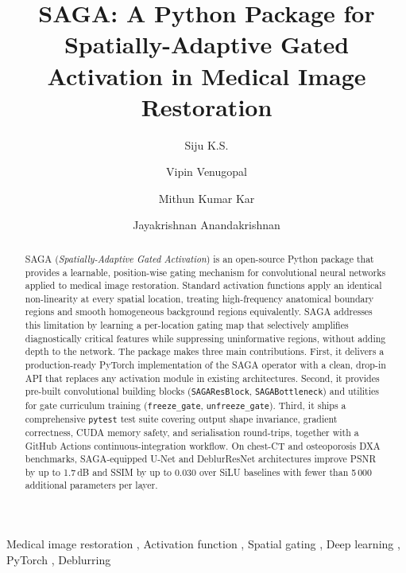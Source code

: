\documentclass[preprint,12pt]{elsarticle}
\begin{document}
\begin{frontmatter}

\title{SAGA: A Python Package for Spatially-Adaptive Gated Activation
       in Medical Image Restoration}

\author[uoh]{Siju K.S.}
\author[uoh]{Vipin Venugopal}
\author[uoh]{Mithun Kumar Kar}
\author[uoh]{Jayakrishnan Anandakrishnan}

\address[uoh]{Department of Computer Science and Engineering,
              [Author Institution], Kerala, India}


\begin{keyword}
Medical image restoration \sep
Activation function \sep
Spatial gating \sep
Deep learning \sep
PyTorch \sep
Deblurring
\end{keyword}

\begin{abstract}
SAGA (\textit{Spatially-Adaptive Gated Activation}) is an open-source Python
package that provides a learnable, position-wise gating mechanism for
convolutional neural networks applied to medical image restoration.
Standard activation functions apply an identical non-linearity at every
spatial location, treating high-frequency anatomical boundary regions and
smooth homogeneous background regions equivalently.
SAGA addresses this limitation by learning a per-location gating map
that selectively amplifies diagnostically critical features while
suppressing uninformative regions, without adding depth to the
network.
The package makes three main contributions.
First, it delivers a production-ready PyTorch implementation of the SAGA
operator with a clean, drop-in API that replaces any activation module in
existing architectures.
Second, it provides pre-built convolutional building blocks
(\texttt{SAGAResBlock}, \texttt{SAGABottleneck}) and utilities for gate
curriculum training (\texttt{freeze\_gate}, \texttt{unfreeze\_gate}).
Third, it ships a comprehensive \texttt{pytest} test suite covering output
shape invariance, gradient correctness, CUDA memory safety, and
serialisation round-trips, together with a GitHub Actions continuous-integration
workflow.
On chest-CT and osteoporosis DXA benchmarks, SAGA-equipped U-Net and
DeblurResNet architectures improve PSNR by up to 1.7\,dB and SSIM by up to
0.030 over SiLU baselines with fewer than 5\,000 additional parameters per layer.
\end{abstract}

\end{frontmatter}
\end{document}
